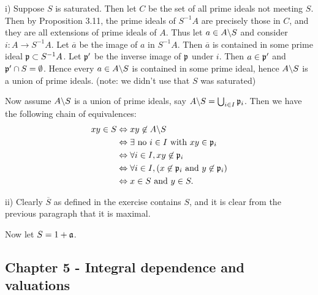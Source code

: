 \documentclass[11pt, english]{article}
\begin{document}
\begin{sol}
i) Suppose $S$ is saturated. Then let $C$ be the set of all prime ideals not meeting $S$. Then by Proposition 3.11, the prime ideals of $S^{-1}A$ are precisely those in $C$, and they are all extensions of prime ideals of $A$. Thus let $a \in A \backslash S$ and consider $i:A \to S^{-1}A$. Let $\overline a$ be the image of $a$ in $S^{-1}A$. Then $\overline a$ is contained in some prime ideal $\mathfrak{p} \subset S^{-1} A$. Let $\mathfrak{p}'$ be the inverse image of $\mathfrak{p}$ under $i$. Then $a \in \mathfrak{p}'$ and $\mathfrak{p}' \cap S = \emptyset$. Hence every $a \in A \backslash S$ is contained in some prime ideal, hence $A \backslash S$ is a union of prime ideals. (note: we didn't use that $S$ was saturated)

Now assume $A \backslash S$ is a union of prime ideals, say $A \backslash S = \bigcup_{i \in I} \mathfrak{p}_i$. Then we have the following chain of equivalences:
\begin{align*}
  xy \in S &\Leftrightarrow xy \not \in A \backslash S \\
&\Leftrightarrow \exists \text{ no } i \in I \text{ with } xy \in \mathfrak{p}_i \\
&\Leftrightarrow \forall i \in I, xy \not \in \mathfrak{p}_i \\
&\Leftrightarrow \forall i \in I, (x \not \in \mathfrak{p}_i \text{ and } y \not \in \mathfrak{p}_i) \\
&\Leftrightarrow x \in S \text{ and } y \in S.
\end{align*}

ii) Clearly $\overline S$ as defined in the exercise contains $S$, and it is clear from the previous paragraph that it is maximal.

Now let $S = 1 + \mathfrak{a}$. 
\end{sol}

\subsection{Chapter 5 - Integral dependence and valuations}
\end{document}
